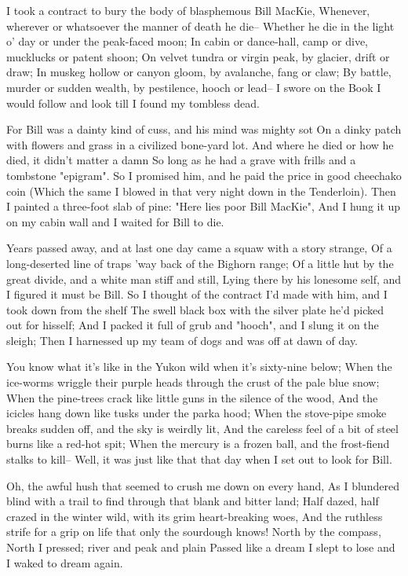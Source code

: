 
\begin{poemblock}
 I took a contract to bury the body of blasphemous Bill MacKie,
 Whenever, wherever or whatsoever the manner of death he die--
 Whether he die in the light o' day or under the peak-faced moon;
 In cabin or dance-hall, camp or dive, mucklucks or patent shoon;
 On velvet tundra or virgin peak, by glacier, drift or draw;
 In muskeg hollow or canyon gloom, by avalanche, fang or claw;
 By battle, murder or sudden wealth, by pestilence, hooch or lead--
 I swore on the Book I would follow and look till I found my tombless dead.

 For Bill was a dainty kind of cuss, and his mind was mighty sot
 On a dinky patch with flowers and grass in a civilized bone-yard lot.
 And where he died or how he died, it didn't matter a damn
 So long as he had a grave with frills and a tombstone "epigram".
 So I promised him, and he paid the price in good cheechako coin
 (Which the same I blowed in that very night down in the Tenderloin).
 Then I painted a three-foot slab of pine:  "Here lies poor Bill MacKie",
 And I hung it up on my cabin wall and I waited for Bill to die.

 Years passed away, and at last one day came a squaw with a story strange,
 Of a long-deserted line of traps 'way back of the Bighorn range;
 Of a little hut by the great divide, and a white man stiff and still,
 Lying there by his lonesome self, and I figured it must be Bill.
 So I thought of the contract I'd made with him,
   and I took down from the shelf
 The swell black box with the silver plate he'd picked out for hisself;
 And I packed it full of grub and "hooch", and I slung it on the sleigh;
 Then I harnessed up my team of dogs and was off at dawn of day.

 You know what it's like in the Yukon wild when it's sixty-nine below;
 When the ice-worms wriggle their purple heads
   through the crust of the pale blue snow;
 When the pine-trees crack like little guns in the silence of the wood,
 And the icicles hang down like tusks under the parka hood;
 When the stove-pipe smoke breaks sudden off, and the sky is weirdly lit,
 And the careless feel of a bit of steel burns like a red-hot spit;
 When the mercury is a frozen ball, and the frost-fiend stalks to kill--
 Well, it was just like that that day when I set out to look for Bill.

 Oh, the awful hush that seemed to crush me down on every hand,
 As I blundered blind with a trail to find
   through that blank and bitter land;
 Half dazed, half crazed in the winter wild,
   with its grim heart-breaking woes,
 And the ruthless strife for a grip on life that only the sourdough knows!
 North by the compass, North I pressed; river and peak and plain
 Passed like a dream I slept to lose and I waked to dream again.


\end{poemblock}
